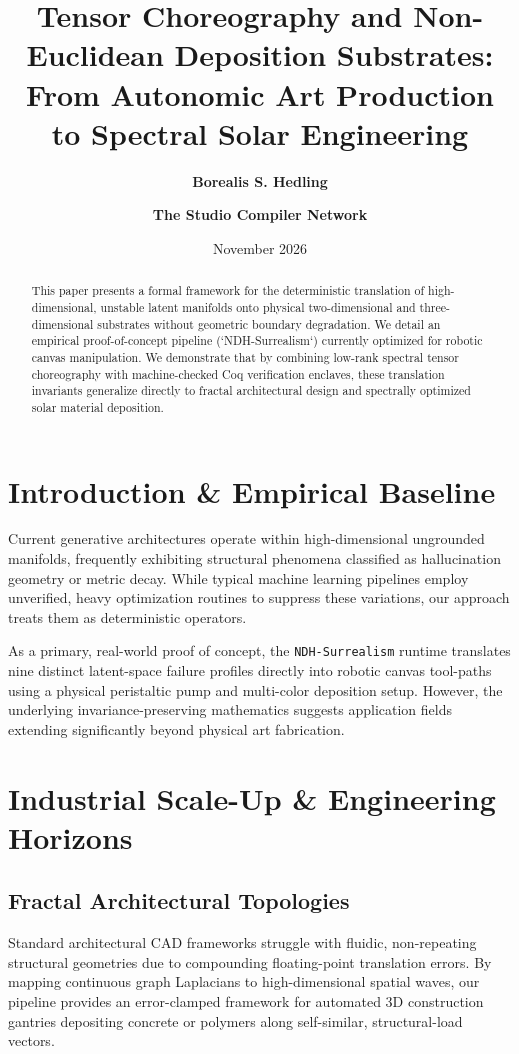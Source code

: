 \documentclass[11pt,twocolumn]{article}
\title{\textbf{Tensor Choreography and Non-Euclidean Deposition Substrates:\\From Autonomic Art Production to Spectral Solar Engineering}}
\author{\textbf{Borealis S. Hedling} \and \textbf{The Studio Compiler Network}}
\date{November 2026}
\begin{document}
\maketitle

\begin{abstract}
This paper presents a formal framework for the deterministic translation of high-dimensional, unstable latent manifolds onto physical two-dimensional and three-dimensional substrates without geometric boundary degradation. We detail an empirical proof-of-concept pipeline (`NDH-Surrealism`) currently optimized for robotic canvas manipulation. We demonstrate that by combining low-rank spectral tensor choreography with machine-checked Coq verification enclaves, these translation invariants generalize directly to fractal architectural design and spectrally optimized solar material deposition.
\end{abstract}

\section{Introduction \& Empirical Baseline}
Current generative architectures operate within high-dimensional ungrounded manifolds, frequently exhibiting structural phenomena classified as hallucination geometry or metric decay. While typical machine learning pipelines employ unverified, heavy optimization routines to suppress these variations, our approach treats them as deterministic operators. 

As a primary, real-world proof of concept, the \texttt{NDH-Surrealism} runtime translates nine distinct latent-space failure profiles directly into robotic canvas tool-paths using a physical peristaltic pump and multi-color deposition setup. However, the underlying invariance-preserving mathematics suggests application fields extending significantly beyond physical art fabrication.

\section{Industrial Scale-Up \& Engineering Horizons}

\subsection{Fractal Architectural Topologies}
Standard architectural CAD frameworks struggle with fluidic, non-repeating structural geometries due to compounding floating-point translation errors. By mapping continuous graph Laplacians to high-dimensional spatial waves, our pipeline provides an error-clamped framework for automated 3D construction gantries depositing concrete or polymers along self-similar, structural-load vectors.
\end{document}
